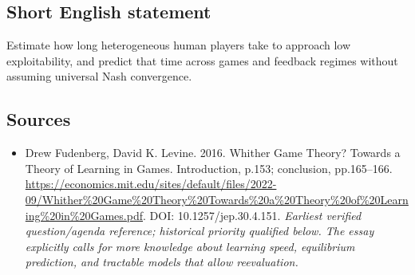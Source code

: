 \documentclass[11pt]{article}
\begin{document}
\subsection{Short English statement}
Estimate how long heterogeneous human players take to approach low exploitability, and predict that time across games and feedback regimes without assuming universal Nash convergence.

\subsection{Sources}
\begin{itemize}\raggedright
\item[\textnormal{[S1]}]\hypertarget{source:30007562:1}{} Drew Fudenberg, David K. Levine. 2016. Whither Game Theory? Towards a Theory of Learning in Games. Introduction, p.153; conclusion, pp.165–166.
\url{https://economics.mit.edu/sites/default/files/2022-09/Whither%20Game%20Theory%20Towards%20a%20Theory%20of%20Learning%20in%20Games.pdf}.
DOI: 10.1257/jep.30.4.151.
{\small\textit{Earliest verified question/agenda reference; historical priority qualified below. The essay explicitly calls for more knowledge about learning speed, equilibrium prediction, and tractable models that allow reevaluation.}}
\end{itemize}
\end{document}
